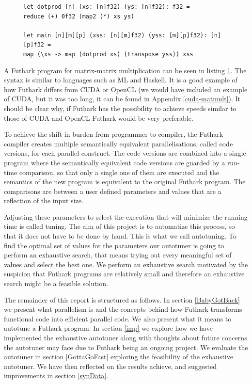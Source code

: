\begin{figure}
\centering
\lstset{language=haskell}
\begin{lstlisting}
let dotprod [n] (xs: [n]f32) (ys: [n]f32): f32 =
reduce (+) 0f32 (map2 (*) xs ys)

let main [n][m][p] (xss: [n][m]f32) (yss: [m][p]f32): [n][p]f32 =
map (\xs -> map (dotprod xs) (transpose yss)) xss
\end{lstlisting}%
\label{IntromatmultFuthark}
\end{figure}
A Futhark program for matrix-matrix multiplication can be seen in listing
\ref{IntromatmultFuthark}. The syntax is similar to languages such as ML and
Haskell. It is a good example of how Futhark differs from CUDA or OpenCL (we
would have included an example of CUDA, but it was too long, it can be found in Appendix
\ref{cuda-matmult}). It should be clear why, if Futhark has the possibility to
achieve speeds similar to those of CUDA and OpenCL Futhark would be very
preferable.

To achieve the shift in burden from programmer to compiler, the Futhark
compiler creates multiple semantically equivalent parallelisations, called code
versions, for each parallel construct. The code versions are combined into
a single program where the semantically equivalent code versions are guarded
by a run-time comparison, so that only a single one of them are executed and the
semantics of the new program is equivalent to the original Futhark program. 
The comparisons are between a user defined parameters and values that are
a reflection of the input size.

Adjusting these parameters to select the execution that will minimize the
running time is called tuning. The aim of this project is to automatize this
process, so that it does not have to be done by hand. This is what we
call autotuning. To find the optimal set of values for the parameters our
autotuner is going to perform an exhaustive search, that means trying out every
meaningful set of values and select the best one. 
We perform an exhaustive search
motivated by the suspicion that Futhark programs are relatively small and therefore 
an exhaustive search might be a feasible solution.

The remainder of this report is structured as follows. In section \ref{BabyGotBack} 
we present what parallelism is and the concepts behind how Futhark transforms functional 
code into efficient parallel code. We also  present what it means to autotune a
Futhark program. 
In section \ref{imp} we explore how we have implemented the exhaustive autotuner along
with thoughts about future concerns the autotuner may face due to Futhark being an
ongoing project. We evaluate the autotuner in section \ref{GottaGoFast}
exploring the feasibility of the exhaustive autotuner. We have then reflected
on the results achieve, and suggested improvements in section \ref{synData}. 

